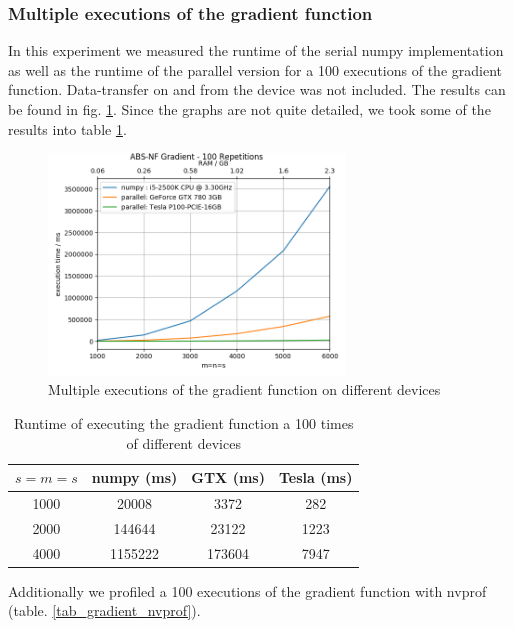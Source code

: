 \subsubsection{Multiple  executions of the gradient function}
In this experiment we measured the runtime of the serial numpy implementation as well as the runtime of the parallel version for a 100 executions of the gradient function. Data-transfer on and from the device was not included. The results can be found in fig. \ref{fig_grad_mult_executions}. Since the graphs are not quite detailed, we took some of the results into table \ref{tab_grad_mult_executions}.
\begin{figure}[ht]
	\centering
	\includegraphics[width=0.7\textwidth]{img/gradient_mult_repetition.png}
	\caption{Multiple executions of the gradient function on different devices}
	\label{fig_grad_mult_executions}
\end{figure}
\begin{table}
	\centering
\begin{tabular}{c|c|c|c}
	$s=m=s$ & numpy (ms) & GTX (ms) & Tesla (ms) \\
	\hline
	1000 & 20008 & 3372 & 282 \\
	2000 & 144644 & 23122 & 1223 \\
	4000 & 1155222 & 173604 & 7947
	
\end{tabular}
\caption{Runtime of executing the gradient function a 100 times of different devices}
\label{tab_grad_mult_executions}
\end{table}

Additionally we profiled a 100 executions of the gradient function with nvprof (table. \ref{tab_gradient_nvprof}).


